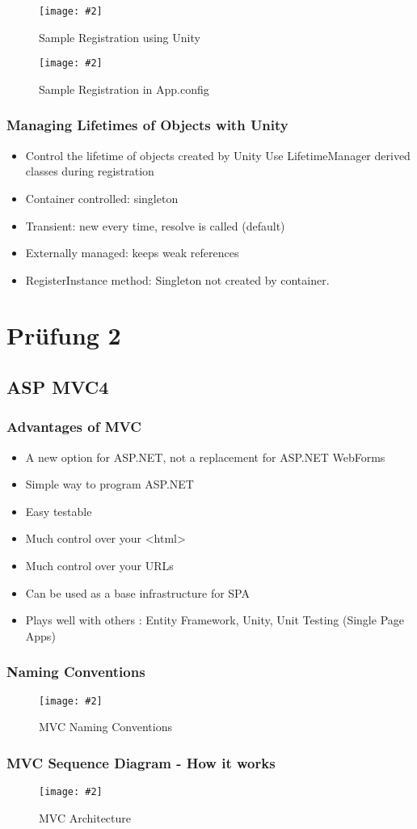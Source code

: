 \documentclass[a4paper,10pt]{scrreprt}
\newcommand{\pic}[2][figure]{\begin{figure}[h]
 \centering
 \texttt{[image: \#2]}
 \caption{#1}
\end{figure}
}
\begin{document}
\pic[Sample Registration using Unity]{regdi.png}
\pic[Sample Registration in App.config]{regconf.png}

\section{Managing Lifetimes of Objects with Unity}
\begin{itemize}
\item Control the lifetime of objects created by Unity
Use LifetimeManager derived classes during
registration
\item Container controlled: singleton
\item  Transient: new every time, resolve is called
(default)
\item Externally managed: keeps weak references
\item RegisterInstance method: Singleton not created by container.
\end{itemize}
\part{Prüfung 2}
\chapter{ASP MVC4}
\section{Advantages of MVC}
\begin{itemize}
\item A new option for ASP.NET, not a replacement
for ASP.NET WebForms
\item Simple way to program ASP.NET
\item Easy testable
\item Much control over your <html>
\item Much control over your URLs
\item Can be used as a base infrastructure for SPA
\item Plays well with others : Entity Framework, Unity, Unit Testing
(Single Page Apps)
\end{itemize}
\section{Naming Conventions}
\pic[MVC Naming Conventions]{mvcname.png}
\section{MVC Sequence Diagram - How it works}
\pic[MVC Architecture]{mvcarch.png}
\end{document}
